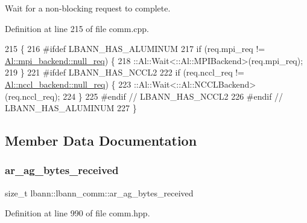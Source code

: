 Wait for a non-\/blocking request to complete. 

Definition at line 215 of file comm.\+cpp.


\begin{DoxyCode}
215                                     \{
216 \textcolor{preprocessor}{#ifdef LBANN\_HAS\_ALUMINUM}
217   \textcolor{keywordflow}{if} (req.mpi\_req != \hyperlink{classlbann_1_1Al_1_1dummy__backend_a458ac4eb9f62b06984b4ef1b1eeb5851}{Al::mpi\_backend::null\_req}) \{
218     ::Al::Wait<::Al::MPIBackend>(req.mpi\_req);
219   \}
221 \textcolor{preprocessor}{#ifdef LBANN\_HAS\_NCCL2}
222   \textcolor{keywordflow}{if} (req.nccl\_req != \hyperlink{classlbann_1_1Al_1_1dummy__backend_a458ac4eb9f62b06984b4ef1b1eeb5851}{Al::nccl\_backend::null\_req}) \{
223     ::Al::Wait<::Al::NCCLBackend>(req.nccl\_req);
224   \}
225 \textcolor{preprocessor}{#endif // LBANN\_HAS\_NCCL2}
226 \textcolor{preprocessor}{#endif // LBANN\_HAS\_ALUMINUM}
227 \}
\end{DoxyCode}


\subsection{Member Data Documentation}
\mbox{\label{classlbann_1_1lbann__comm_afded6f478dc5021d1edec306dc6c528c}} 
\subsubsection{\texorpdfstring{ar\+\_\+ag\+\_\+bytes\+\_\+received}{ar\_ag\_bytes\_received}}
{\footnotesize\ttfamily size\+\_\+t lbann\+::lbann\+\_\+comm\+::ar\+\_\+ag\+\_\+bytes\+\_\+received\hspace{0.3cm}{\ttfamily [private]}}



Definition at line 990 of file comm.\+hpp.

\mbox{\label{classlbann_1_1lbann__comm_a2cfe1264a83865360692c48d7869fe67}} 
